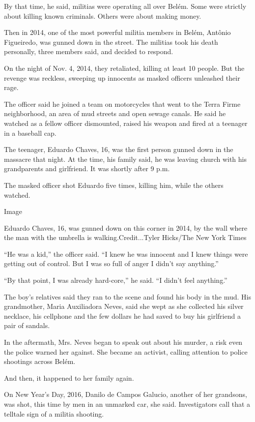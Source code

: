 By that time, he said, militias were operating all over Belém. Some were
strictly about killing known criminals. Others were about making money.

Then in 2014, one of the most powerful militia members in Belém, Antônio
Figueiredo, was gunned down in the street. The militias took his death
personally, three members said, and decided to respond.

On the night of Nov. 4, 2014, they retaliated, killing at least 10
people. But the revenge was reckless, sweeping up innocents as masked
officers unleashed their rage.

The officer said he joined a team on motorcycles that went to the Terra
Firme neighborhood, an area of mud streets and open sewage canals. He
said he watched as a fellow officer dismounted, raised his weapon and
fired at a teenager in a baseball cap.

The teenager, Eduardo Chaves, 16, was the first person gunned down in
the massacre that night. At the time, his family said, he was leaving
church with his grandparents and girlfriend. It was shortly after 9 p.m.

The masked officer shot Eduardo five times, killing him, while the
others watched.

Image

Eduardo Chaves, 16, was gunned down on this corner in 2014, by the wall
where the man with the umbrella is walking.Credit...Tyler Hicks/The New
York Times

``He was a kid,'' the officer said. ``I knew he was innocent and I knew
things were getting out of control. But I was so full of anger I didn't
say anything.''

``By that point, I was already hard-core,'' he said. ``I didn't feel
anything.''

The boy's relatives said they ran to the scene and found his body in the
mud. His grandmother, Maria Auxiliadora Neves, said she wept as she
collected his silver necklace, his cellphone and the few dollars he had
saved to buy his girlfriend a pair of sandals.

In the aftermath, Mrs. Neves began to speak out about his murder, a risk
even the police warned her against. She became an activist, calling
attention to police shootings across Belém.

And then, it happened to her family again.

On New Year's Day, 2016, Danilo de Campos Galucio, another of her
grandsons, was shot, this time by men in an unmarked car, she said.
Investigators call that a telltale sign of a militia shooting.

